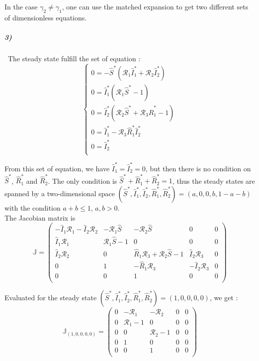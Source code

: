\documentclass{article}
\begin{document}
In the case $\gamma_2 \neq \gamma_1$, one can use the matched expansion to get two different sets of dimensionless equations.
\subparagraph{3)}
\
The steady state fulfill the set of equation :
$$ \displaystyle \left \{
    \begin{array}{ll}
        0=-\widehat{S}^*(\pmb{\mathcal{R}}_1 \widehat{I}_1^*+ \pmb{\mathcal{R}}_2 \widehat{I}_2^*)\\
		0= \widehat{I}_1^*(\pmb{\mathcal{R}}_1 \widehat{S}^*-1) \\
		0= \widehat{I}_2^*(\pmb{\mathcal{R}}_2 \widehat{S}^* + \pmb{\mathcal{R}}_3 \widehat{R}_1^* - 1) \\
		0= \widehat{I}_1^*-\pmb{\mathcal{R}}_3 \widehat{R}_1^* \widehat{I}_2^* \\
		0= \widehat{I}_2^* \\
    \end{array}
\right. $$

From this set of equation, we have $\widehat{I}_1^*=\widehat{I}_2^*=0$, but then there is no condition on $\widehat{S}^*$, $\widehat{R}_1^*$ and $\widehat{R}_2^*$. The only condition is $\widehat{S}^*+\widehat{R}_1^*+\widehat{R}_2^*=1$, thus the steady states are spanned by a two-dimensional space  $(\widehat{S}^*,\widehat{I}_1^*,\widehat{I}_2^*,\widehat{R}_1^*,\widehat{R}_2^*)=(a,0,0,b,1-a-b)$ with the condition $a+b \leq 1$, $a,b>0$.
\\

The Jacobian matrix is 
$$
\mathbb{J}=\left(
\begin{array}{ccccc}
 -\widehat{I}_1 \pmb{\mathcal{R}}_1-\widehat{I}_2 \pmb{\mathcal{R}}_2 & -\pmb{\mathcal{R}}_1 \widehat{S} & -\pmb{\mathcal{R}}_2 \widehat{S} & 0 & 0 \\
 \widehat{I}_1 \pmb{\mathcal{R}}_1 & \pmb{\mathcal{R}}_1 \widehat{S}-1 & 0 & 0 & 0 \\
 \widehat{I}_2 \pmb{\mathcal{R}}_2 & 0 & \widehat{R}_1 \pmb{\mathcal{R}}_3+\pmb{\mathcal{R}}_2 \widehat{S}-1 & \widehat{I}_2 \pmb{\mathcal{R}}_3 & 0 \\
 0 & 1 & -\widehat{R}_1 \pmb{\mathcal{R}}_3 & -\widehat{I}_2 \pmb{\mathcal{R}}_3 & 0 \\
 0 & 0 & 1 & 0 & 0 \\
\end{array}
\right)
$$

Evaluated for the steady state $(\widehat{S}^*,\widehat{I}_1^*,\widehat{I}_2^*,\widehat{R}_1^*,\widehat{R}_2^*)=(1,0,0,0,0)$, we get :
$$
\mathbb{J}_{(1,0,0,0,0)}=
\left(
\begin{array}{ccccc}
 0 & -\pmb{\mathcal{R}}_1 & -\pmb{\mathcal{R}}_2 & 0 & 0 \\
 0 & \pmb{\mathcal{R}}_1-1 & 0 & 0 & 0 \\
 0 & 0 & \pmb{\mathcal{R}}_2-1 & 0 & 0 \\
 0 & 1 & 0 & 0 & 0 \\
 0 & 0 & 1 & 0 & 0 \\
\end{array}
\right)
$$
\end{document}
